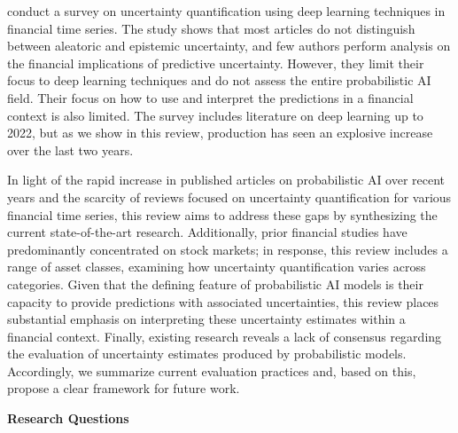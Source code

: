 \textcite{Blasco_et_al_2024} conduct a survey on uncertainty quantification using deep learning techniques in financial time series. The study shows that most articles do not distinguish between aleatoric and epistemic uncertainty, and few authors perform analysis on the financial implications of predictive uncertainty. However, they limit their focus to deep learning techniques and do not assess the entire probabilistic AI field. Their focus on how to use and interpret the predictions in a financial context is also limited. The survey includes literature on deep learning up to 2022, but as we show in this review, production has seen an explosive increase over the last two years. 

In light of the rapid increase in published articles on probabilistic AI over recent years and the scarcity of reviews focused on uncertainty quantification for various financial time series, this review aims to address these gaps by synthesizing the current state-of-the-art research. Additionally, prior financial studies have predominantly concentrated on stock markets; in response, this review includes a range of asset classes, examining how uncertainty quantification varies across categories. Given that the defining feature of probabilistic AI models is their capacity to provide predictions with associated uncertainties, this review places substantial emphasis on interpreting these uncertainty estimates within a financial context. Finally, existing research reveals a lack of consensus regarding the evaluation of uncertainty estimates produced by probabilistic models. Accordingly, we summarize current evaluation practices and, based on this, propose a clear framework for future work. 





\textbf{Research Questions}\nopagebreak

